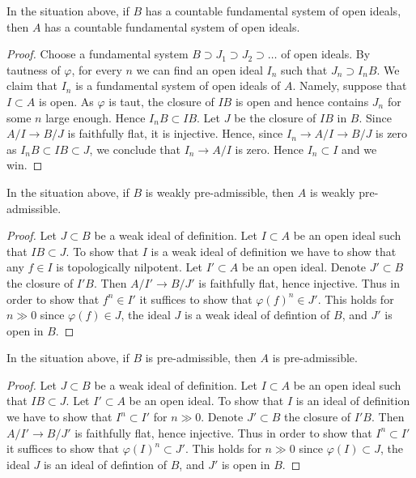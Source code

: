 \begin{lemma}
\label{lemma-taut-descent-countable}
In the situation above, if $B$ has a countable fundamental system of
open ideals, then $A$ has a countable fundamental system of open ideals.
\end{lemma}

\begin{proof}
Choose a fundamental system $B \supset J_1 \supset J_2 \supset \ldots$
of open ideals. By tautness of $\varphi$, for every $n$ we can find an
open ideal $I_n$ such that $J_n \supset I_nB$. We claim that
$I_n$ is a fundamental system of open ideals of $A$.
Namely, suppose that $I \subset A$ is open. As $\varphi$ is taut,
the closure of $IB$ is open and hence contains $J_n$ for some $n$
large enough. Hence $I_nB \subset IB$. Let $J$ be the closure of
$IB$ in $B$. Since $A/I \to B/J$ is faithfully flat, it is injective.
Hence, since $I_n \to A/I \to B/J$ is zero as $I_nB \subset IB \subset J$,
we conclude that $I_n \to A/I$ is zero. Hence $I_n \subset I$ and
we win.
\end{proof}

\begin{lemma}
\label{lemma-taut-descent-weakly-admissible}
In the situation above, if $B$ is weakly pre-admissible, then
$A$ is weakly pre-admissible.
\end{lemma}

\begin{proof}
Let $J \subset B$ be a weak ideal of definition. Let $I \subset A$
be an open ideal such that $IB \subset J$. To show that $I$ is a weak ideal
of definition we have to show that any $f \in I$ is topologically nilpotent.
Let $I' \subset A$ be an open ideal. Denote $J' \subset B$ the closure
of $I'B$. Then $A/I' \to B/J'$ is faithfully flat, hence injective.
Thus in order to show that $f^n \in I'$ it suffices to show
that $\varphi(f)^n \in J'$. This holds for $n \gg 0$ since
$\varphi(f) \in J$, the ideal $J$ is a weak ideal of defintion of $B$,
and $J'$ is open in $B$.
\end{proof}

\begin{lemma}
\label{lemma-taut-descent-admissible}
In the situation above, if $B$ is pre-admissible, then $A$
is pre-admissible.
\end{lemma}

\begin{proof}
Let $J \subset B$ be a weak ideal of definition. Let $I \subset A$
be an open ideal such that $IB \subset J$. Let $I' \subset A$ be an open ideal.
To show that $I$ is an ideal of definition we have to show that
$I^n \subset I'$ for $n \gg 0$. Denote $J' \subset B$ the closure
of $I'B$. Then $A/I' \to B/J'$ is faithfully flat, hence injective.
Thus in order to show that $I^n \subset I'$ it suffices to show
that $\varphi(I)^n \subset J'$. This holds for $n \gg 0$ since
$\varphi(I) \subset J$, the ideal $J$ is an ideal of defintion of $B$,
and $J'$ is open in $B$.
\end{proof}

